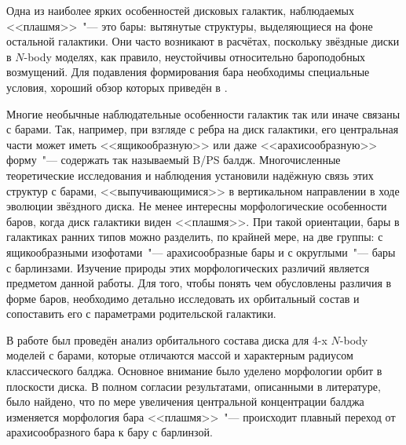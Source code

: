 \documentclass{trlnotes}
\let\citet\cite
\begin{document}
Одна из наиболее ярких особенностей дисковых галактик, наблюдаемых <<плашмя>>~"--- это бары:
вытянутые структуры, выделяющиеся на фоне остальной галактики.
Они часто возникают в расчётах, поскольку звёздные диски в $N$-body моделях, как правило, неустойчивы относительно бароподобных возмущений.
Для подавления формирования бара необходимы специальные условия, хороший обзор которых приведён 
в \citet{sellwood2019}.

Многие необычные наблюдательные особенности галактик так или иначе связаны с барами. 
Так, например, при взгляде с ребра на диск галактики, его центральная части может иметь 
<<ящикообразную>> или даже <<арахисообразную>> форму~"--- содержать так называемый B/PS балдж. 
Многочисленные теоретические исследования и наблюдения установили надёжную связь этих структур с барами, <<выпучивающимися>> в вертикальном направлении в ходе эволюции звёздного диска.
Не менее интересны морфологические особенности баров, когда диск галактики виден <<плашмя>>. При такой ориентации, бары в галактиках ранних типов можно разделить, по крайней мере, на две группы: с ящикообразными изофотами~"--- арахисообразные бары и с округлыми~"--- бары с барлинзами. 
Изучение природы этих морфологических различий является предметом данной работы.
Для того, чтобы понять чем обусловлены различия в форме баров, необходимо детально исследовать их орбитальный состав
и сопоставить его с параметрами родительской галактики.

В работе был проведён анализ орбитального состава диска для 4-x $N$-body моделей с барами, которые 
отличаются массой и характерным радиусом классического балджа. Основное внимание было уделено морфологии орбит в плоскости диска. 
В полном согласии результатами, описанными в литературе, было найдено, что по мере увеличения центральной концентрации балджа 
изменяется морфология бара <<плашмя>>~"--- происходит плавный переход от арахисообразного бара к бару с барлинзой.
\end{document}
